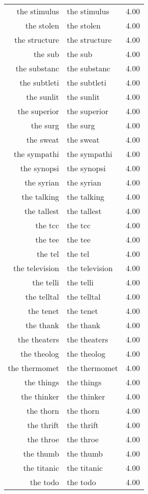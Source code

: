 \begin{table}[ht]
\begin{tabular}{rlr}
  the stimulus & the stimulus & 4.00 \\ 
  the stolen & the stolen & 4.00 \\ 
  the structure & the structure & 4.00 \\ 
  the sub & the sub & 4.00 \\ 
  the substanc & the substanc & 4.00 \\ 
  the subtleti & the subtleti & 4.00 \\ 
  the sunlit & the sunlit & 4.00 \\ 
  the superior & the superior & 4.00 \\ 
  the surg & the surg & 4.00 \\ 
  the sweat & the sweat & 4.00 \\ 
  the sympathi & the sympathi & 4.00 \\ 
  the synopsi & the synopsi & 4.00 \\ 
  the syrian & the syrian & 4.00 \\ 
  the talking & the talking & 4.00 \\ 
  the tallest & the tallest & 4.00 \\ 
  the tcc & the tcc & 4.00 \\ 
  the tee & the tee & 4.00 \\ 
  the tel & the tel & 4.00 \\ 
  the television & the television & 4.00 \\ 
  the telli & the telli & 4.00 \\ 
  the telltal & the telltal & 4.00 \\ 
  the tenet & the tenet & 4.00 \\ 
  the thank & the thank & 4.00 \\ 
  the theaters & the theaters & 4.00 \\ 
  the theolog & the theolog & 4.00 \\ 
  the thermomet & the thermomet & 4.00 \\ 
  the things & the things & 4.00 \\ 
  the thinker & the thinker & 4.00 \\ 
  the thorn & the thorn & 4.00 \\ 
  the thrift & the thrift & 4.00 \\ 
  the throe & the throe & 4.00 \\ 
  the thumb & the thumb & 4.00 \\ 
  the titanic & the titanic & 4.00 \\ 
  the todo & the todo & 4.00 \\ 

\end{tabular}
\end{table}
